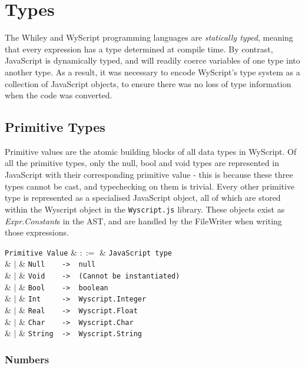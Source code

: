 \chapter{Types}
The Whiley and WyScript programming languages are {\em statically typed}, meaning that every expression has a type determined at compile time.  By contrast, JavaScript is dynamically typed, and will readily coerce variables of one type into another type. As a result, it was necessary to encode WyScript's type system as a collection of JavaScript objects, to ensure there was no loss of type information when the code was converted.

\section{Primitive Types}
\label{c_types_primitive_types}

Primitive values are the atomic building blocks of all data types in WyScript. Of all the primitive types, only the null, bool and void types are represented in JavaScript with their corresponding primitive value - this is because these three types cannot be cast, and typechecking on them is trivial. Every other primitive type is represented as a specialised JavaScript object, all of which are stored within the Wyscript object in the \verb+Wyscript.js+ library. These objects exist as {\em Expr.Constant}s in the AST, and are handled by the FileWriter when writing those expressions. 

\begin{syntax}
  \verb+Primitive Value+ & $::=$ & \verb+JavaScript type+\\
  & $|$ & \verb+Null    ->  null+\\
  & $|$ & \verb+Void    ->  (Cannot be instantiated)+\\
  & $|$ & \verb+Bool    ->  boolean+\\
  & $|$ & \verb+Int     ->  Wyscript.Integer+\\
  & $|$ & \verb+Real    ->  Wyscript.Float+\\
  & $|$ & \verb+Char    ->  Wyscript.Char+\\
  & $|$ & \verb+String  ->  Wyscript.String+\\
\end{syntax}


\subsection{Numbers}
\label{c_types_number}


